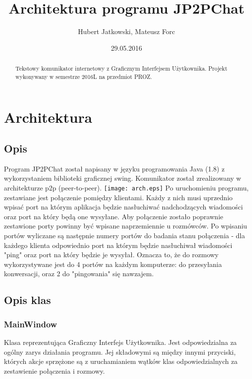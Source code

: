 \documentclass[a4paper,11pt]{article}
\title{Architektura programu JP2PChat}
\author{Hubert Jatkowski, Mateusz Forc}
\date{29.05.2016}
\begin{document}
\maketitle

\begin{abstract}
Tekstowy komunikator internetowy z Graficznym Interfejsem Użytkownika. Projekt wykonywany w semestrze 2016L na przedmiot PROZ.
\end{abstract}

\section{Architektura}

\subsection {Opis}
Program JP2PChat został napisany w języku programowania Java (1.8)
\newline z wykorzystaniem biblioteki graficznej swing.\newline
Komunikator został zrealizowany w architekturze p2p (peer-to-peer).\newline
\centering
\texttt{[image: arch.eps]}
\justifying
\newline Po uruchomieniu programu, zestawiane jest połączenie pomiędzy klientami. 
Każdy z nich musi uprzednio wpisać port na którym aplikacja będzie nasłuchiwać nadchodzących wiadomości oraz port na który będą one wysyłane. 
Aby połączenie zostało poprawnie zestawione porty powinny być wpisane naprzemiennie u rozmówców. 
Po wpisaniu portów wyliczane są następnie numery portów do badania stanu połączenia - dla każdego klienta odpowiednio port na którym będzie nasłuchiwał wiadomości "ping" oraz port na który będzie je wysyłał. 
Oznacza to, że do rozmowy wykorzystywane jest do 4 portów na każdym komputerze:  do przesyłania konwersacji, oraz 2 do "pingowania" się nawzajem.\newline

\subsection{Opis klas}

\subsubsection{MainWindow}
Klasa reprezentująca Graficzny Interfejs Użytkownika.
Jest odpowiedzialna za ogólny zarys działania programu.
Jej składowymi są między innymi przyciski, których akcje sprzężone są z uruchamianiem wątków klas odpowiedzialnych za zestawienie połączenia i rozmowy.
\end{document}
